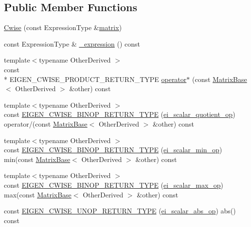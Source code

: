 \subsection*{Public Member Functions}
\begin{DoxyCompactItemize}
\item 
\hyperlink{class_cwise_a26297dc051f10c5714c104cee27b2d4b}{Cwise} (const Expression\-Type \&\hyperlink{glext_8h_a7b24a3f2f56eb1244ae69dacb4fecb6f}{matrix})
\item 
const Expression\-Type \& \hyperlink{class_cwise_a12b2b67eae93fbb261eb666d1a3c3136}{\-\_\-expression} () const 
\item 
{\footnotesize template$<$typename Other\-Derived $>$ }\\const \\*
E\-I\-G\-E\-N\-\_\-\-C\-W\-I\-S\-E\-\_\-\-P\-R\-O\-D\-U\-C\-T\-\_\-\-R\-E\-T\-U\-R\-N\-\_\-\-T\-Y\-P\-E \hyperlink{class_cwise_a76cf61a544231927e5aac224b36317aa}{operator$\ast$} (const \hyperlink{class_matrix_base}{Matrix\-Base}$<$ Other\-Derived $>$ \&other) const 
\item 
{\footnotesize template$<$typename Other\-Derived $>$ }\\const \hyperlink{class_cwise_ac236f4975027bcbd1fd87114b349cf81}{E\-I\-G\-E\-N\-\_\-\-C\-W\-I\-S\-E\-\_\-\-B\-I\-N\-O\-P\-\_\-\-R\-E\-T\-U\-R\-N\-\_\-\-T\-Y\-P\-E} (\hyperlink{structei__scalar__quotient__op}{ei\-\_\-scalar\-\_\-quotient\-\_\-op}) operator/(const \hyperlink{class_matrix_base}{Matrix\-Base}$<$ Other\-Derived $>$ \&other) const 
\item 
{\footnotesize template$<$typename Other\-Derived $>$ }\\const \hyperlink{class_cwise_a41f6346b12679d973839cf271f202ada}{E\-I\-G\-E\-N\-\_\-\-C\-W\-I\-S\-E\-\_\-\-B\-I\-N\-O\-P\-\_\-\-R\-E\-T\-U\-R\-N\-\_\-\-T\-Y\-P\-E} (\hyperlink{structei__scalar__min__op}{ei\-\_\-scalar\-\_\-min\-\_\-op}) min(const \hyperlink{class_matrix_base}{Matrix\-Base}$<$ Other\-Derived $>$ \&other) const 
\item 
{\footnotesize template$<$typename Other\-Derived $>$ }\\const \hyperlink{class_cwise_a0d30e4ac0d629ed3d9ec39ac4eacf117}{E\-I\-G\-E\-N\-\_\-\-C\-W\-I\-S\-E\-\_\-\-B\-I\-N\-O\-P\-\_\-\-R\-E\-T\-U\-R\-N\-\_\-\-T\-Y\-P\-E} (\hyperlink{structei__scalar__max__op}{ei\-\_\-scalar\-\_\-max\-\_\-op}) max(const \hyperlink{class_matrix_base}{Matrix\-Base}$<$ Other\-Derived $>$ \&other) const 
\item 
const \hyperlink{class_cwise_a7ce7de4da00c02ef9c938fa0e1f941ae}{E\-I\-G\-E\-N\-\_\-\-C\-W\-I\-S\-E\-\_\-\-U\-N\-O\-P\-\_\-\-R\-E\-T\-U\-R\-N\-\_\-\-T\-Y\-P\-E} (\hyperlink{structei__scalar__abs__op}{ei\-\_\-scalar\-\_\-abs\-\_\-op}) abs() const 

\end{DoxyCompactItemize}

